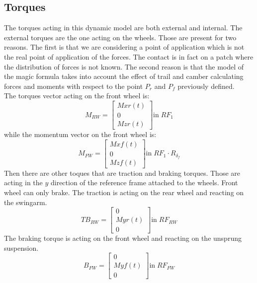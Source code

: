 \subsection{Torques}
%
The torques acting in this dynamic model are both external and internal.
The external torques are the one acting on the wheels. Those are present for two reasons. The first is that we are considering a point of application which is not the real point of application of the forces. The contact is in fact on a patch where the distribution of forces is not known. The second reason is that the model of the magic formula \cite{pacejka2006tyre} takes into account the effect of trail and camber calculating forces and moments with respect to the point $P_r$ and $P_f$ previously defined.\\
The torques vector acting on the front wheel is:
%
\begin{equation}
    M_{RW} = 
    \left[
    \begin{array}{c}
        Mxr(t)\\
        0\\
        Mzr(t)
    \end{array}
    \right ]
    \text{in} \; RF_1
\end{equation}
%
while the momentum vector on the front wheel is:
%
\begin{equation}
    M_{FW} = 
    \left[
    \begin{array}{c}
        Mxf(t)\\
        0\\
        Mzf(t)
    \end{array}
    \right ]
    \text{in} \; RF_1 \cdot R_{\delta_f}
\end{equation}
%
Then there are other toques that are traction and braking torques. Those are acting in the $y$ direction of the reference frame attached to the wheels. Front wheel can only brake.
The traction is acting on the rear wheel and reacting on the swingarm.
%
\begin{equation}
    TB_{RW} = 
    \left[
    \begin{array}{c}
        0\\
        Myr(t)\\
        0
    \end{array}
    \right ]
    \text{in} \; RF_{RW}
\end{equation}
%
The braking torque is acting on the front wheel and reacting on the unsprung suspension.
%
\begin{equation}
    B_{FW} = 
    \left[
    \begin{array}{c}
        0\\
        Myf(t)\\
        0
    \end{array}
    \right ]
    \text{in} \; RF_{FW}
\end{equation}
